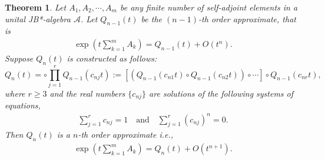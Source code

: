 \documentclass{article}
\theoremstyle{plain} %
\newtheorem{thm}{Theorem}[section]
\numberwithin{equation}{section}
\newcommand{\zw}[1]{{\color{UGARed}{#1\textsuperscript{ZW}}}}
\begin{document}
\iffalse 
\begin{thm}\label{thm:Trotter:higher:JB*}\zw{Add Q2}
    Let $A_1, A_2,\cdots, A_m$ be any finite number of self-adjoint elements in a unital JB*-algebra $\mathcal{A}$. Let $Q_{n-1}(t)$ be the $(n-1)$-th order approximate, that is 
    \begin{align} \label{eqt:n-1:approximate}
       \exp\left(t\sum_{k=1}^m A_k\right)=Q_{n-1}(t)+O(t^n). 
    \end{align}
Suppose $Q_n(t)$ is constructed as follows:
\begin{equation}\label{eq:non-symmetric:approximant}
    Q_n(t)= \circ \prod_{j=1}^r Q_{n-1}(c_{nj} t) :=\left[\left(Q_{n-1}(c_{n1} t)\circ Q_{n-1}(c_{n2} t)\right)\circ \cdots\right]\circ Q_{n-1}(c_{nr} t),   
\end{equation}
where $r\geq 3$ and the real numbers $\{c_{nj}\}$ are solutions of the following systems of equations, 
\begin{align}\label{eqt:norder}
    \sum_{j=1}^r c_{nj}=1\quad\mbox{and}\quad\sum_{j=1}^r (c_{nj})^n=0.	
\end{align}
Then  $Q_n(t)$ is a $n$-th order approximate i.e., 
\begin{align} \label{eqt:norder:approximate}
       \exp\left(t\sum_{k=1}^m A_k\right)=Q_{n}(t)+O(t^{n+1}). 
    \end{align}
\end{thm}
\end{document}
